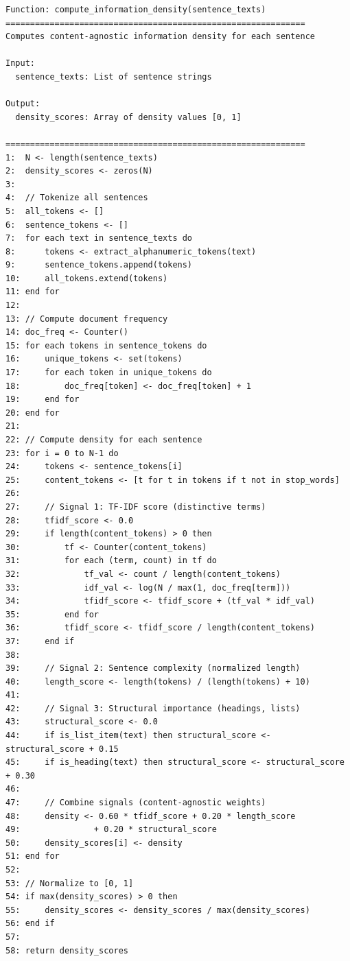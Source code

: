 \documentclass[12pt,a4paper]{report}
\begin{document}
\begin{verbatim}
Function: compute_information_density(sentence_texts)
=============================================================
Computes content-agnostic information density for each sentence

Input:
  sentence_texts: List of sentence strings
  
Output:
  density_scores: Array of density values [0, 1]

=============================================================
1:  N <- length(sentence_texts)
2:  density_scores <- zeros(N)
3:  
4:  // Tokenize all sentences
5:  all_tokens <- []
6:  sentence_tokens <- []
7:  for each text in sentence_texts do
8:      tokens <- extract_alphanumeric_tokens(text)
9:      sentence_tokens.append(tokens)
10:     all_tokens.extend(tokens)
11: end for
12:
13: // Compute document frequency
14: doc_freq <- Counter()
15: for each tokens in sentence_tokens do
16:     unique_tokens <- set(tokens)
17:     for each token in unique_tokens do
18:         doc_freq[token] <- doc_freq[token] + 1
19:     end for
20: end for
21:
22: // Compute density for each sentence
23: for i = 0 to N-1 do
24:     tokens <- sentence_tokens[i]
25:     content_tokens <- [t for t in tokens if t not in stop_words]
26:     
27:     // Signal 1: TF-IDF score (distinctive terms)
28:     tfidf_score <- 0.0
29:     if length(content_tokens) > 0 then
30:         tf <- Counter(content_tokens)
31:         for each (term, count) in tf do
32:             tf_val <- count / length(content_tokens)
33:             idf_val <- log(N / max(1, doc_freq[term]))
34:             tfidf_score <- tfidf_score + (tf_val * idf_val)
35:         end for
36:         tfidf_score <- tfidf_score / length(content_tokens)
37:     end if
38:     
39:     // Signal 2: Sentence complexity (normalized length)
40:     length_score <- length(tokens) / (length(tokens) + 10)
41:     
42:     // Signal 3: Structural importance (headings, lists)
43:     structural_score <- 0.0
44:     if is_list_item(text) then structural_score <- structural_score + 0.15
45:     if is_heading(text) then structural_score <- structural_score + 0.30
46:     
47:     // Combine signals (content-agnostic weights)
48:     density <- 0.60 * tfidf_score + 0.20 * length_score 
49:               + 0.20 * structural_score
50:     density_scores[i] <- density
51: end for
52:
53: // Normalize to [0, 1]
54: if max(density_scores) > 0 then
55:     density_scores <- density_scores / max(density_scores)
56: end if
57:
58: return density_scores
\end{verbatim}
\end{document}
